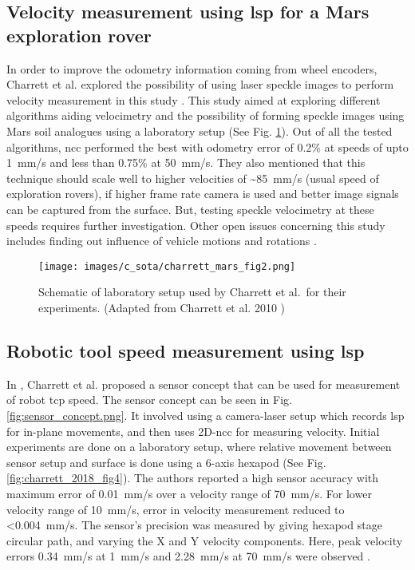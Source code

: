     \subsection{Velocity measurement using \gls{lsp} for a Mars exploration rover}
        In order to improve the odometry information coming from wheel encoders, Charrett et al. explored the possibility of using laser speckle images to perform velocity measurement in this study \cite{charrett_mars}. This study aimed at exploring different algorithms aiding velocimetry and the possibility of forming speckle images using Mars soil analogues using a laboratory setup (See Fig. \ref{fig:charrett_mars_fig2.png}). Out of all the tested algorithms, \gls{ncc} performed the best with odometry error of 0.2\% at speeds of upto \SI{1}{\milli\meter/\second} and less than 0.75\% at \SI{50}{\milli\meter/\second}. They also mentioned that this technique should scale well to higher velocities of \sim\SI{85}{\milli\meter/\second} (usual speed of exploration rovers), if higher frame rate camera is used and better image signals can be captured from the surface. But, testing speckle velocimetry at these speeds requires further investigation. Other open issues concerning this study includes finding out influence of vehicle motions and rotations \cite{charrett_mars}.

        \begin{figure}[ht]
            \centering
            \texttt{[image: images/c\_sota/charrett\_mars\_fig2.png]}
            \caption{Schematic of laboratory setup used by Charrett et al.\ for their experiments. (Adapted from Charrett et al. 2010 \cite{charrett_mars})}
            \label{fig:charrett_mars_fig2.png}
        \end{figure}
        
    \subsection{Robotic tool speed measurement using \gls{lsp}} \label{subsection:robotic_tool_speed}
        In \cite{charrett_2018}, Charrett et al. proposed a sensor concept that can be used for measurement of robot \gls{tcp} speed. The sensor concept can be seen in Fig. \ref{fig:sensor_concept.png}. It involved using a camera-laser setup which records \gls{lsp} for in-plane movements, and then uses 2D-\gls{ncc} for measuring velocity. Initial experiments are done on a laboratory setup, where relative movement between sensor setup and surface is done using a 6-axis hexapod (See Fig. \ref{fig:charrett_2018_fig4}). The authors reported a high sensor accuracy with maximum error of \pm\SI{0.01}{\milli\meter/\second} over a velocity range of \pm\SI{70}{\milli\meter/\second}. For lower velocity range of \pm\SI{10}{\milli\meter/\second}, error in velocity measurement reduced to \textless \SI{0.004}{\milli\meter/\second}. The sensor's precision was measured by giving hexapod stage circular path, and varying the X and Y velocity components. Here, peak velocity errors \SI{0.34}{\milli\meter/\second} at \SI{1}{\milli\meter/\second} and \pm\SI{2.28}{\milli\meter/\second} at \pm\SI{70}{\milli\meter/\second} were observed \cite{charrett_2018}.
        


